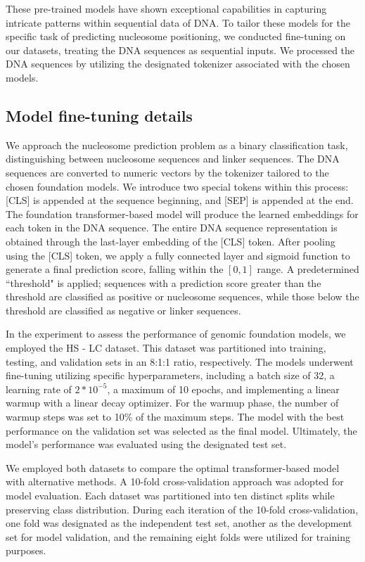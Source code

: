 \documentclass[a4paper,fleqn]{cas-dc}
\begin{document}
These pre-trained models have shown exceptional capabilities in capturing intricate patterns within sequential data of DNA. To tailor these models for the specific task of predicting nucleosome positioning, we conducted fine-tuning on our datasets, treating the DNA sequences as sequential inputs. We processed the DNA sequences by utilizing the designated tokenizer associated with the chosen models.

\subsection{Model fine-tuning details}

We approach the nucleosome prediction problem as a binary classification task, distinguishing between nucleosome sequences and linker sequences. The DNA sequences are converted to numeric vectors by the tokenizer tailored to the chosen foundation models. We introduce two special tokens within this process: [CLS] is appended at the sequence beginning, and [SEP] is appended at the end. The foundation transformer-based model will produce the learned embeddings for each token in the DNA sequence. The entire DNA sequence representation is obtained through the last-layer embedding of the [CLS] token. After pooling using the [CLS] token, we apply a fully connected layer and sigmoid function to generate a final prediction score, falling within the $[0,1]$ range. A predetermined ``threshold" is applied; sequences with a prediction score greater than the threshold are classified as positive or nucleosome sequences, while those below the threshold are classified as negative or linker sequences.

In the experiment to assess the performance of genomic foundation models, we employed the HS - LC dataset. This dataset was partitioned into training, testing, and validation sets in an 8:1:1 ratio, respectively. The models underwent fine-tuning utilizing specific hyperparameters, including a batch size of 32, a learning rate of $2 * 10^{-5}$, a maximum of 10 epochs, and implementing a linear warmup with a linear decay optimizer. For the warmup phase, the number of warmup steps was set to 10\% of the maximum steps. The model with the best performance on the validation set was selected as the final model. Ultimately, the model's performance was evaluated using the designated test set.

We employed both datasets to compare the optimal transformer-based model with alternative methods. A 10-fold cross-validation approach was adopted for model evaluation. Each dataset was partitioned into ten distinct splits while preserving class distribution. During each iteration of the 10-fold cross-validation, one fold was designated as the independent test set, another as the development set for model validation, and the remaining eight folds were utilized for training purposes.
\end{document}
